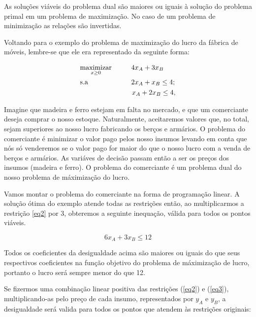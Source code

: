 \begin{teo}
As soluções viáveis do problema dual são maiores ou iguais à solução do problema primal em um problema de maximização. No caso de um problema de minimização as relações são invertidas. 
\end{teo}


Voltando para o exemplo do problema de maximização do lucro da fábrica de móveis, lembre-se que ele era representado da seguinte forma:

\begin{align}
    & \underset{x\geq0}{\text{maximizar}} \hspace{1cm} 4x_A+3x_B \label{eq1} \\
    & \text{s.a}  \hspace{2.2cm} 2x_A+x_B \leq 4; \label{eq2} \\
    &             \hspace{2.65cm} x_A+2x_B\leq 4, \label{eq3}
\end{align}

Imagine que madeira e ferro estejam em falta no mercado, e que um comerciante deseja comprar o nosso estoque. Naturalmente, aceitaremos valores que, no total, sejam superiores ao nosso lucro fabricando os berços e armários. O problema do comerciante é minimizar o valor pago pelos nosso insumos levando em conta que nós só venderemos se o valor pago for maior do que o nosso lucro com a venda de berços e armários. As variáves de decisão passam então a ser os preços dos insumos (madeira e ferro). O problema do comerciante é um problema dual do nosso problema de máximização do lucro. 

Vamos montar o problema do comerciante na forma de programação linear. A solução ótima do exemplo atende todas as restrições então, ao multiplicarmos a restrição \ref{eq2} por 3, obteremos a seguinte inequação, válida para todos os pontos viáveis.

\begin{equation}
6x_{A}+3x_{B}\leq12
\label{eq:dual1}
\end{equation}

Todos os coeficientes da desigualdade acima são maiores ou iguais do que seus respectivos coeficientes na função objetivo do problema de máximização de lucro, portanto o lucro será sempre menor do que 12.

Se fizermos uma combinação linear positiva das restrições (\ref{eq2}) e (\ref{eq3}), multiplicando-as pelo preço de cada insumo, representados por $y_A$ e $y_B$, a desigualdade será valida para todos os pontos que atendem às restrições originais:


